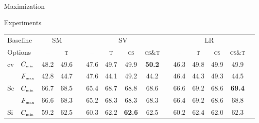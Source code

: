 \documentclass[12pt]{beamer}
\begin{document}
\begin{frame}{Maximization}
	\begin{block}{Experiments}
		\newcommand{\Cm}{$C_{\text{\tiny min}}$}
		\newcommand{\Fm}{$F_{\text{\tiny max}}$}
		\begin{table}
			\centering
			\setlength{\tabcolsep}{2.5pt}
			\begin{tabular}{l@{\ }c*{13}{c}}
				\toprule
				\multicolumn{2}{l}{Baseline}
				                                        & \multicolumn{2}{c}{SM} &            & \multicolumn{4}{c}{SV} &    & \multicolumn{4}{c}{LR}                                                                                                                                           \\
				\cmidrule(lr){3-4} \cmidrule(lr){6-9} \cmidrule(lr){11-14}
				\multicolumn{2}{l}{Options}
				                                        & --                     & \scshape t &                        & -- & \scshape t             & \scshape cs & \scshape cs{\scriptsize\&}t &               & -- & \scshape t & \scshape cs & \scshape cs{\scriptsize\&}t                 \\
				\midrule
				\multicolumn{1}{l}{\multirow{2}{*}{cv}} & \Cm                    & 48.2       & 49.6                   &    & 47.6                   & 49.7        & 49.9                        & \textbf{50.2} &    & 46.3       & 49.8        & 49.9                        & 49.9          \\
				\multicolumn{1}{l}{}                    & \Fm                    & 42.8       & 44.7                   &    & 47.6                   & 44.1        & 49.2                        & 44.2          &    & 46.4       & 44.3        & 49.3                        & 44.5          \\
				\hline
				\multicolumn{1}{l}{\multirow{2}{*}{Sc}} & \Cm                    & 66.7       & 68.5                   &    & 65.4                   & 68.7        & 68.8                        & 68.6          &    & 66.6       & 69.2        & 68.6                        & \textbf{69.4} \\
				\multicolumn{1}{l}{}                    & \Fm                    & 66.6       & 68.3                   &    & 65.2                   & 68.3        & 68.3                        & 68.3          &    & 66.4       & 69.2        & 68.6                        & 68.8          \\
				\hline
				\multicolumn{1}{l}{\multirow{2}{*}{Si}} & \Cm                    & 59.2       & 62.5                   &    & 60.3                   & 62.2        & \textbf{62.6}               & 62.5          &    & 60.2       & 62.4        & 62.0                        & 62.3          \\

\end{tabular}
\end{table}
\end{block}
\end{frame}
\end{document}
